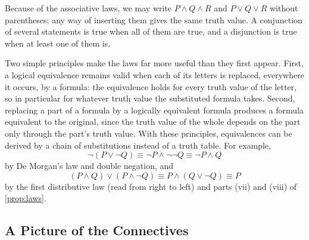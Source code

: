 \begin{table}
\end{table}

Because of the associative laws, we may write $P\wedge Q\wedge R$ and $P\vee Q\vee R$ without parentheses; any way of inserting them gives the same truth value. A conjunction of several statements is true when all of them are true, and a disjunction is true when at least one of them is.

Two simple principles make the laws far more useful than they first appear. First, a logical equivalence remains valid when each of its letters is replaced, everywhere it occurs, by a formula: the equivalence holds for every truth value of the letter, so in particular for whatever truth value the substituted formula takes. Second, replacing a part of a formula by a logically equivalent formula produces a formula equivalent to the original, since the truth value of the whole depends on the part only through the part's truth value. With these principles, equivalences can be derived by a chain of substitutions instead of a truth table. For example,
\[
\neg(P\vee\neg Q)\equiv\neg P\wedge\neg\neg Q\equiv\neg P\wedge Q
\]
by De Morgan's law and double negation, and
\[
(P\wedge Q)\vee(P\wedge\neg Q)\equiv P\wedge(Q\vee\neg Q)\equiv P
\]
by the first distributive law (read from right to left) and parts (vii) and (viii) of \cref{prop:laws}.

\subsection{A Picture of the Connectives}

